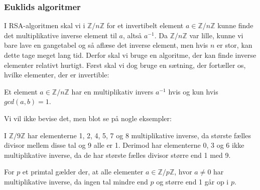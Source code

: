 \documentclass[12pt]{article}
\begin{document}
\subsubsection*{Euklids algoritmer}
I RSA-algoritmen skal vi i $\mathbb{Z}/n\mathbb{Z}$ for et invertibelt element $a\in \mathbb{Z}/n\mathbb{Z}$ kunne finde det multiplikative inverse element til $a$, altså $a^{-1}$. Da $\mathbb{Z}/n\mathbb{Z}$ var lille, kunne vi bare lave en gangetabel og så aflæse det inverse element, men hvis $n$ er stor, kan dette tage meget lang tid. Derfor skal vi bruge en algoritme, der kan finde inverse elementer relativt hurtigt. Først skal vi dog bruge en sætning, der fortæller os, hvilke elementer, der er invertible:
\begin{setn}
Et element  $a\in \mathbb{Z}/n\mathbb{Z}$ har en multiplikativ invers $a^{-1}$ hvis og kun hvis $\textit{gcd}(a,b)= 1$. 
\end{setn}
Vi vil ikke bevise det, men blot se på nogle eksempler:
\begin{exa}
I $\mathbb{Z}/9\mathbb{Z}$ har elementerne 1, 2, 4, 5, 7 og 8 multiplikative inverse, da største fælles divisor mellem disse tal og 9 alle er 1. Derimod har elementerne 0, 3 og 6 ikke multiplikative inverse, da de har største fælles divisor større end 1 med 9.
\end{exa}
\begin{exa}
For $p$ et primtal gælder der,  at alle elementer $a\in \mathbb{Z}/p\mathbb{Z}$, hvor $a\neq 0$ har multiplikative inverse, da ingen tal mindre end $p$ og større end 1 går op i $p$. 
\end{exa}
\end{document}
